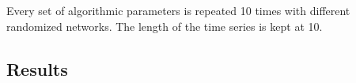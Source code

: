 % 
%    
Every set of algorithmic parameters is repeated 10 times with different randomized networks. The length of the time series is kept at 10.


\subsection{Results}
    
